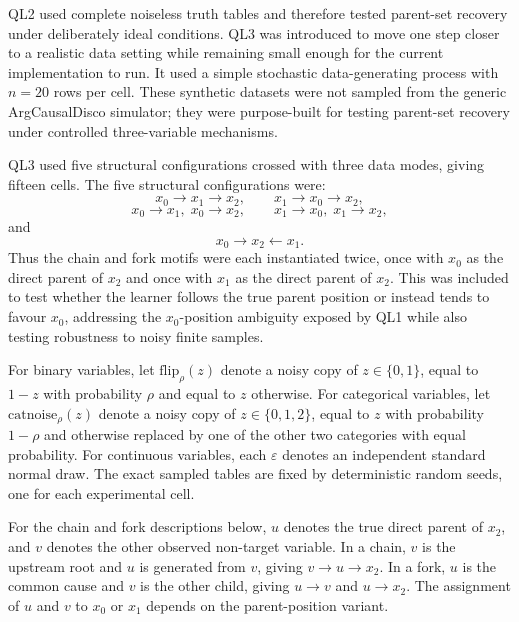 QL2 used complete noiseless truth tables and therefore tested parent-set recovery under deliberately ideal conditions. QL3 was introduced to move one step closer to a realistic data setting while remaining small enough for the current implementation to run. It used a simple stochastic data-generating process with \(n=20\) rows per cell. These synthetic datasets were not sampled from the generic ArgCausalDisco simulator; they were purpose-built for testing parent-set recovery under controlled three-variable mechanisms.

QL3 used five structural configurations crossed with three data modes, giving fifteen cells. The five structural configurations were:
\[
x_0\to x_1\to x_2,\qquad
x_1\to x_0\to x_2,
\]
\[
x_0\to x_1,\;x_0\to x_2,\qquad
x_1\to x_0,\;x_1\to x_2,
\]
and
\[
x_0\to x_2\leftarrow x_1.
\]
Thus the chain and fork motifs were each instantiated twice, once with \(x_0\) as the direct parent of \(x_2\) and once with \(x_1\) as the direct parent of \(x_2\). This was included to test whether the learner follows the true parent position or instead tends to favour \(x_0\), addressing the \(x_0\)-position ambiguity exposed by QL1 while also testing robustness to noisy finite samples.

For binary variables, let \(\mathrm{flip}_{\rho}(z)\) denote a noisy copy of \(z\in\{0,1\}\), equal to \(1-z\) with probability \(\rho\) and equal to \(z\) otherwise. For categorical variables, let \(\mathrm{catnoise}_{\rho}(z)\) denote a noisy copy of \(z\in\{0,1,2\}\), equal to \(z\) with probability \(1-\rho\) and otherwise replaced by one of the other two categories with equal probability. For continuous variables, each \(\varepsilon\) denotes an independent standard normal draw. The exact sampled tables are fixed by deterministic random seeds, one for each experimental cell.

For the chain and fork descriptions below, \(u\) denotes the true direct parent of \(x_2\), and \(v\) denotes the other observed non-target variable. In a chain, \(v\) is the upstream root and \(u\) is generated from \(v\), giving \(v \to u \to x_2\). In a fork, \(u\) is the common cause and \(v\) is the other child, giving \(u\to v\) and \(u\to x_2\). The assignment of \(u\) and \(v\) to \(x_0\) or \(x_1\) depends on the parent-position variant.

